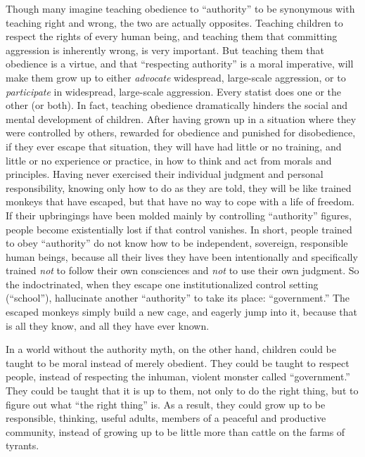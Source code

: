 \documentclass{book}
\begin{document}
Though many imagine teaching obedience to \enquote{authority} to be synonymous with teaching right and wrong, the two are actually opposites. Teaching children to respect the rights of every human being, and teaching them that committing aggression is inherently wrong, is very important. But teaching them that obedience is a virtue, and that \enquote{respecting authority} is a moral imperative, will make them grow up to either \emph{advocate} widespread, large-scale aggression, or to \emph{participate} in widespread, large-scale aggression. Every statist does one or the other (or both). In fact, teaching obedience dramatically hinders the social and mental development of children. After having grown up in a situation where they were controlled by others, rewarded for obedience and punished for disobedience, if they ever escape that situation, they will have had little or no training, and little or no experience or practice, in how to think and act from morals and principles. Having never exercised their individual judgment and personal responsibility, knowing only how to do as they are told, they will be like trained monkeys that have escaped, but that have no way to cope with a life of freedom. If their upbringings have been molded mainly by controlling \enquote{authority} figures, people become existentially lost if that control vanishes. In short, people trained to obey \enquote{authority} do not know how to be independent, sovereign, responsible human beings, because all their lives they have been intentionally and specifically trained \emph{not} to follow their own consciences and \emph{not} to use their own judgment. So the indoctrinated, when they escape one institutionalized control setting (\enquote{school}), hallucinate another \enquote{authority} to take its place: \enquote{government.} The escaped monkeys simply build a new cage, and eagerly jump into it, because that is all they know, and all they have ever known.

In a world without the authority myth, on the other hand, children could be taught to be moral instead of merely obedient. They could be taught to respect people, instead of respecting the inhuman, violent monster called \enquote{government.} They could be taught that it is up to them, not only to do the right thing, but to figure out what \enquote{the right thing} is. As a result, they could grow up to be responsible, thinking, useful adults, members of a peaceful and productive community, instead of growing up to be little more than cattle on the farms of tyrants.
\end{document}
